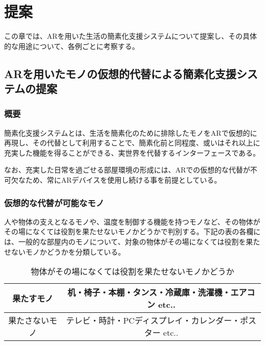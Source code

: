 
\chapter{提案}
\label{chap:suggestion}

この章では、ARを用いた生活の簡素化支援システムについて提案し、その具体的な用途について、各例ごとに考察する。

\newpage

\section{ARを用いたモノの仮想的代替による簡素化支援システムの提案}
\label{chap:suggestionDetail}

\subsection{概要}

簡素化支援システムとは、生活を簡素化のために排除したモノをARで仮想的に再現し、その代替として利用することで、簡素化前と同程度、或いはそれ以上に充実した機能を得ることができる、実世界を代替するインターフェースである。

なお、充実した日常を過ごせる部屋環境の形成には、ARでの仮想的な代替が不可欠なため、常にARデバイスを使用し続ける事を前提としている。

\subsection{仮想的な代替が可能なモノ}

人や物体の支えとなるモノや、温度を制御する機能を持つモノなど、その物体がその場になくては役割を果たせないモノかどうかで判別する。下記の表の各欄には、一般的な部屋内のモノについて、対象の物体がその場になくては役割を果たせないモノかどうかを分類している。

\begin{table}[htbp]
    \caption{物体がその場になくては役割を果たせないモノかどうか}
    \label{tb:mono}
    \begin{center}\begin{tabular}{c|c}
      \hline
      果たすモノ&机・椅子・本棚・タンス・冷蔵庫・洗濯機・エアコン etc..\\\hline
      果たさないモノ&テレビ・時計・PCディスプレイ・カレンダー・ポスター etc..\\\hline
    \end{tabular}\end{center}
\end{table}


